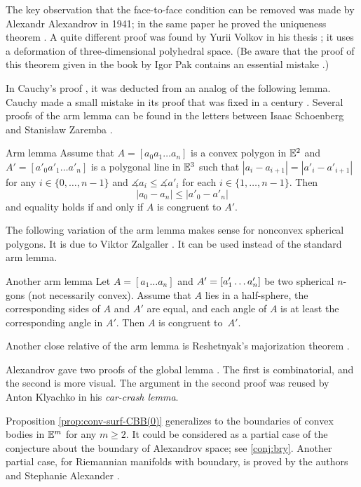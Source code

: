 The key observation that the face-to-face condition can be removed was made by
Alexandr Alexandrov in 1941; in the same paper he proved the uniqueness theorem \cite{alexandrov-1941}.
A quite different proof was found by Yurii Volkov in his thesis \cite{volkov}; it uses a deformation of three-dimensional polyhedral space.
(Be aware that the proof of this theorem given in the book by Igor Pak contains an essential mistake \cite{petrunin-2023}.)

In Cauchy's proof \cite{cauchy}, it was deducted from an analog of the following lemma.
Cauchy made a small mistake in its proof that was fixed in a century \cite{sabitov}.
Several proofs of the arm lemma can be found in the letters between Isaac Schoenberg and Stanisław Zaremba \cite{schoenberg-zaremba}.

\begin{thm}{Arm lemma}\label{lem:arm}
Assume that $A=[a_0 a_1\dots a_n]$ is a convex polygon in $\mathbb{E}^2$
and $A'=[a'_0 a'_1\dots a'_n]$ is a polygonal line in $\mathbb{E}^3$
such that
$|a_i-a_{i+1}|=|a'_i-a'_{i+1}|$ for any $i\in\{0,\dots,n-1\}$
and
$\measuredangle a_i\le \measuredangle a'_i$
for each $i\in\{1,\dots,n-1\}$.
Then
$$|a_0-a_n|\le |a'_0-a'_n|$$
and equality holds if and only if $A$ is congruent to $A'$.
\end{thm}

The following variation of the arm lemma makes sense for nonconvex spherical polygons.
It is due to Viktor Zalgaller \cite{zalgaller}.
It can be used instead of the standard arm lemma.

\begin{thm}{Another arm lemma}
Let $A=[a_1\dots a_n]$ and $A'=[a'_1\dots a'_n]$ be two spherical $n$-gons (not necessarily convex).
Assume that $A$ lies in a half-sphere,
the corresponding sides of $A$ and $A'$ are equal,
and each angle of $A$ is at least the corresponding angle in $A'$.
Then $A$ is congruent to~$A'$.
\end{thm}

Another close relative of the arm lemma is Reshetnyak's majorization theorem \cite{reshetnyak}.

Alexandrov gave two proofs of the global lemma \cite[2.1.2 and 2.1.3]{alexandrov}.
The first is combinatorial, and the second is more visual.
The argument in the second proof was reused by Anton Klyachko \cite{klyachko} in his \emph{car-crash lemma}.

Proposition \ref{prop:conv-surf-CBB(0)} generalizes to the boundaries of convex bodies  in $\mathbb{E}^m$ for any $m\ge 2$.
It could be considered as a partial case of the conjecture about the boundary of Alexandrov space; see \ref{conj:bry}.
Another partial case, for Riemannian manifolds with boundary, is proved by the authors and Stephanie Alexander \cite{alexander-kapovitch-petrunin-2008}.

